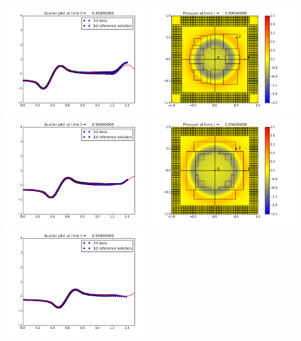 \documentclass[11pt]{article}
\begin{document}
\includegraphics[width=0.475\textwidth]{frame0009fig3.png}
\vskip 10pt 
\includegraphics[width=0.475\textwidth]{frame0010fig0.png}
\includegraphics[width=0.475\textwidth]{frame0010fig3.png}
\vskip 10pt 
\includegraphics[width=0.475\textwidth]{frame0011fig0.png}
\includegraphics[width=0.475\textwidth]{frame0011fig3.png}
\end{document}
